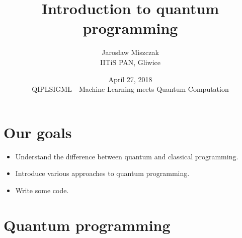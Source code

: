 \documentclass{beamer}
\title[A]{Introduction to quantum programming}
\author{Jaros\l aw Miszczak\\ IITiS PAN, Gliwice}
\date{April 27, 2018\\ QIPLSIGML---Machine Learning meets Quantum Computation}
\begin{document}
\begin{frame}{}
   \maketitle 
\end{frame}

\begin{frame}{}
  \tableofcontents[hideallsubsections]
\end{frame}

\section{Our goals}

\begin{frame}{\insertsection}
    \begin{itemize}
        \item<1-> Understand the difference between quantum and classical 
        programming.
        \item<2-> Introduce various approaches to quantum programming.
        \item<3-> Write some code.\\ 
    \end{itemize}
\end{frame}


\section{Quantum programming}

\begin{frame}
    \begin{center}
        {\color{iitis-orange} \LARGE \insertsection}
    \end{center}
\end{frame}
\end{document}

